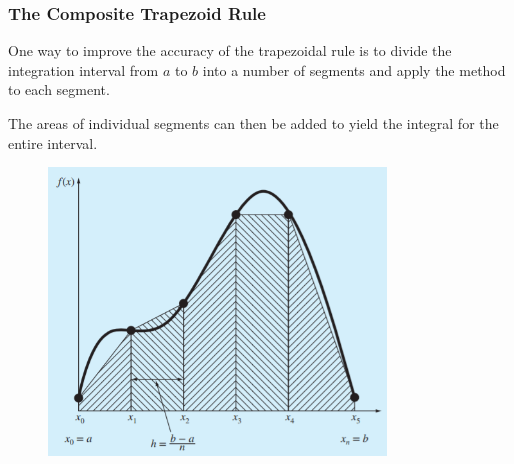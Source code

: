 \documentclass{if-beamer}
\begin{document}
\begin{frame}
	\frametitle{The Composite Trapezoid Rule}
	One way to improve the accuracy of the trapezoidal rule is to divide the integration interval from $a$ to $b$ into a number of segments and apply the method to each segment.\\\vspace{10pt}
	\begin{minipage}{0.5\textwidth}
	 The areas of individual segments can then be added to yield the integral for the entire interval.\\\vspace{4pt}

	\end{minipage}
	\begin{minipage}{0.5\textwidth}
		\begin{figure}
			\centering
			\includegraphics[width=0.8\textwidth]{figures/compositeTrap}
		\end{figure}
	\end{minipage}
\end{frame}
\end{document}
